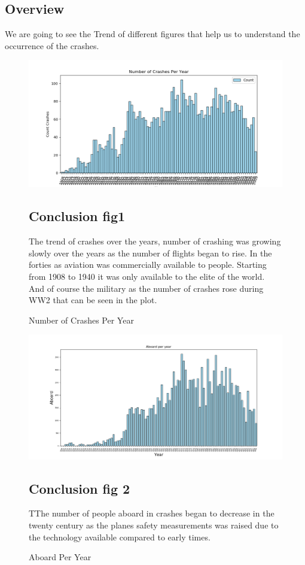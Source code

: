 \documentclass{article}
\begin{document}
\subsection{Overview}
\textbf{}We are going to see the Trend of different figures that help us to understand the occurrence of the crashes.
\begin{figure}[!hbt]

\includegraphics[width=1.3\linewidth,height=0.500\textheight]{COunt_of_Crashes.png}
\caption{Number of Crashes Per Year}
\label{fig:}
\subsection{Conclusion fig1}
The trend of crashes over the years, number of crashing was growing slowly over the years as the number of flights began to rise. In the forties as aviation was commercially available to people. Starting from 1908 to 1940 it was only available to the elite of the world. And of course the military as the number of crashes rose during WW2 that can be seen in the plot.
\end{figure}



\begin{figure}[!hbt]

\includegraphics[width=1.3\linewidth,height=0.500\textheight]{Aboard_per_year.png}
\caption{Aboard Per Year}
\label{fig2:}
\subsection{Conclusion fig 2}
TThe number of people aboard in crashes began to decrease in the twenty century as the planes safety measurements was raised due to the technology available compared to early times.
\end{figure}
\end{document}
